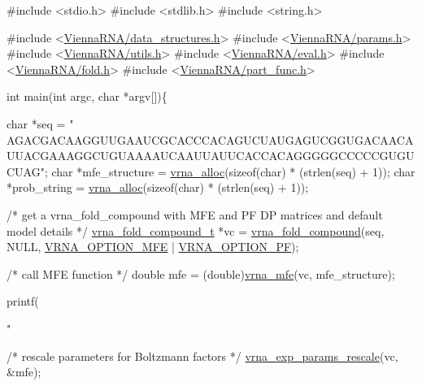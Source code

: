 \begin{DoxyCodeInclude}
\textcolor{preprocessor}{#include <stdio.h>}
\textcolor{preprocessor}{#include <stdlib.h>}
\textcolor{preprocessor}{#include <string.h>}

\textcolor{preprocessor}{#include  <\hyperlink{data__structures_8h}{ViennaRNA/data\_structures.h}>}
\textcolor{preprocessor}{#include  <\hyperlink{params_8h}{ViennaRNA/params.h}>}
\textcolor{preprocessor}{#include  <\hyperlink{utils_8h}{ViennaRNA/utils.h}>}
\textcolor{preprocessor}{#include  <\hyperlink{eval_8h}{ViennaRNA/eval.h}>}
\textcolor{preprocessor}{#include  <\hyperlink{fold_8h}{ViennaRNA/fold.h}>}
\textcolor{preprocessor}{#include  <\hyperlink{part__func_8h}{ViennaRNA/part\_func.h}>}


\textcolor{keywordtype}{int} main(\textcolor{keywordtype}{int} argc, \textcolor{keywordtype}{char} *argv[])\{

  \textcolor{keywordtype}{char}  *seq = \textcolor{stringliteral}{"
      AGACGACAAGGUUGAAUCGCACCCACAGUCUAUGAGUCGGUGACAACAUUACGAAAGGCUGUAAAAUCAAUUAUUCACCACAGGGGGCCCCCGUGUCUAG"};
  \textcolor{keywordtype}{char}  *mfe\_structure = \hyperlink{group__utils_gaf37a0979367c977edfb9da6614eebe99}{vrna\_alloc}(\textcolor{keyword}{sizeof}(\textcolor{keywordtype}{char}) * (strlen(seq) + 1));
  \textcolor{keywordtype}{char}  *prob\_string   = \hyperlink{group__utils_gaf37a0979367c977edfb9da6614eebe99}{vrna\_alloc}(\textcolor{keyword}{sizeof}(\textcolor{keywordtype}{char}) * (strlen(seq) + 1));

  \textcolor{comment}{/* get a vrna\_fold\_compound with MFE and PF DP matrices and default model details */}
  \hyperlink{group__fold__compound_structvrna__fc__s}{vrna\_fold\_compound\_t} *vc = \hyperlink{group__fold__compound_ga6601d994ba32b11511b36f68b08403be}{vrna\_fold\_compound}(seq, NULL, 
      \hyperlink{group__fold__compound_gae63be9127fe7dcc1f9bb14f5bb1064ee}{VRNA\_OPTION\_MFE} | \hyperlink{group__fold__compound_gabfbadcddda3e74ce7f49035ef8f058f7}{VRNA\_OPTION\_PF});

  \textcolor{comment}{/* call MFE function */}
  \textcolor{keywordtype}{double} mfe = (double)\hyperlink{group__mfe__fold_gabd3b147371ccf25c577f88bbbaf159fd}{vrna\_mfe}(vc, mfe\_structure);

  printf(\textcolor{stringliteral}{"%

  \textcolor{comment}{/* rescale parameters for Boltzmann factors */}
  \hyperlink{group__energy__parameters_gad607bc3a5b5da16400e2ca4ea5560233}{vrna\_exp\_params\_rescale}(vc, &mfe);

}
\end{DoxyCodeInclude}
